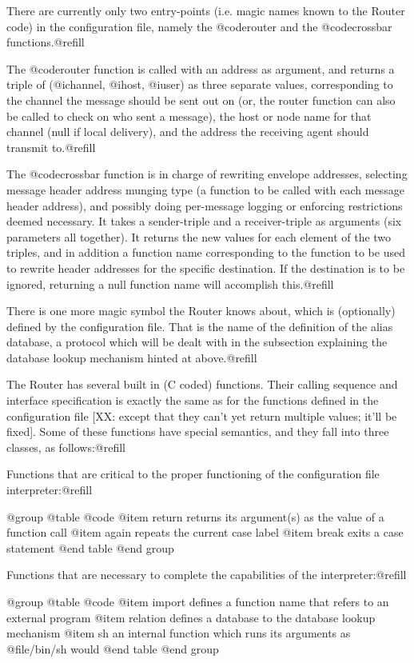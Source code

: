 {There are currently only two entry-points (i.e. magic names known to the
Router code) in the configuration file, namely the @code{router} and the
@code{crossbar} functions.@refill

The @code{router} function is called with an address as argument, and
returns a triple of (@i{channel}, @i{host}, @i{user}) as three separate
values, corresponding to the channel the message should be sent out on
(or, the router function can also be called to check on who sent a message),
the host or node name for that channel (null if local delivery), and the
address the receiving agent should transmit to.@refill

The @code{crossbar} function is in charge of rewriting envelope addresses,
selecting message header address munging type (a function to be called
with each message header address), and possibly doing per-message logging
or enforcing restrictions deemed necessary. It takes a sender-triple and a
receiver-triple as arguments (six parameters all together). It returns the
new values for each element of the two triples, and in addition a function
name corresponding to the function to be used to rewrite header addresses
for the specific destination.  If the destination is to be ignored, returning
a null function name will accomplish this.@refill

There is one more magic symbol the Router knows about, which is
(optionally) defined by the configuration file.  That is the name of the
definition of the alias database, a protocol which will be dealt with
in the subsection explaining the database lookup mechanism hinted at
above.@refill

The Router has several built in (C coded) functions.  Their calling sequence
and interface specification is exactly the same as for the functions defined
in the configuration file [XX: except that they can't yet return multiple
values; it'll be fixed].  Some of these functions have special semantics,
and they fall into three classes, as follows:@refill

Functions that are critical to the proper functioning of the configuration
file interpreter:@refill

@group
@table @code
@item return
returns its argument(s) as the value of a function call
@item again
repeats the current case label
@item break
exits a case statement
@end table
@end group

Functions that are necessary to complete the capabilities of the
interpreter:@refill

@group
@table @code
@item import
defines a function name that refers to an external program
@item relation
defines a database to the database lookup mechanism
@item sh
an internal function which runs its arguments as @file{/bin/sh} would
@end table
@end group

}
